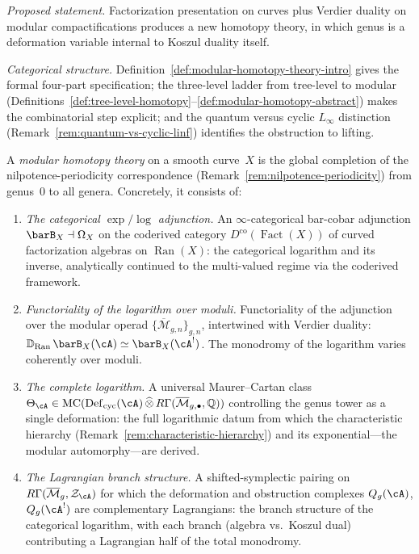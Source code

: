 \emph{Proposed statement.}
Factorization presentation on curves plus Verdier duality on
modular compactifications produces a new homotopy theory, in which
genus is a deformation variable internal to Koszul duality itself.

\emph{Categorical structure.}
Definition~\ref{def:modular-homotopy-theory-intro} gives the
formal four-part specification; the three-level ladder from
tree-level to modular
(Definitions~\ref{def:tree-level-homotopy}--\ref{def:modular-homotopy-abstract})
makes the combinatorial step explicit; and the quantum versus cyclic
$L_\infty$ distinction
(Remark~\ref{rem:quantum-vs-cyclic-linf}) identifies the obstruction
to lifting.

\begin{definition}
\label{def:modular-homotopy-theory-working}
A \emph{modular homotopy theory} on a smooth curve~$X$ is the
global completion of the nilpotence-periodicity correspondence
(Remark~\ref{rem:nilpotence-periodicity}) from genus~$0$ to all
genera.  Concretely, it consists of:
\begin{enumerate}[label=\textup{(\roman*)}]
\item \emph{The categorical $\exp/\log$ adjunction.}  An
  $\infty$-categorical bar-cobar adjunction
  $\barB_X \dashv \Omega_X$ on the coderived category
  $D^{\mathrm{co}}(\operatorname{Fact}(X))$ of curved factorization
  algebras on $\operatorname{Ran}(X)$: the categorical logarithm and
  its inverse, analytically continued to the multi-valued regime via
  the coderived framework.
\item \emph{Functoriality of the logarithm over moduli.}
  Functoriality of the adjunction over the modular operad
  $\{\overline{\mathcal{M}}_{g,n}\}_{g,n}$, intertwined with Verdier
  duality:
  $\mathbb{D}_{\operatorname{Ran}}\,\barB_X(\cA)
  \simeq \barB_X(\cA^!)$.  The monodromy of the logarithm varies
  coherently over moduli.
\item \emph{The complete logarithm.}  A universal Maurer--Cartan class
  $\Theta_{\cA} \in
  \operatorname{MC}(\operatorname{Def}_{\mathrm{cyc}}(\cA)
  \,\widehat{\otimes}\,
  R\Gamma(\overline{\mathcal{M}}_{g,\bullet}, \mathbb{Q}))$
  controlling the genus tower as a single deformation: the full
  logarithmic datum from which the characteristic hierarchy
  (Remark~\ref{rem:characteristic-hierarchy}) and
  its exponential---the modular automorphy---are derived.
\item \emph{The Lagrangian branch structure.}  A shifted-symplectic
  pairing on
  $R\Gamma(\overline{\mathcal{M}}_g, \mathcal{Z}_{\cA})$
  for which the deformation and obstruction complexes
  $Q_g(\cA)$, $Q_g(\cA^!)$ are complementary Lagrangians: the
  branch structure of the categorical logarithm, with each
  branch (algebra vs.\ Koszul dual) contributing a Lagrangian
  half of the total monodromy.
\end{enumerate}
\end{definition}

